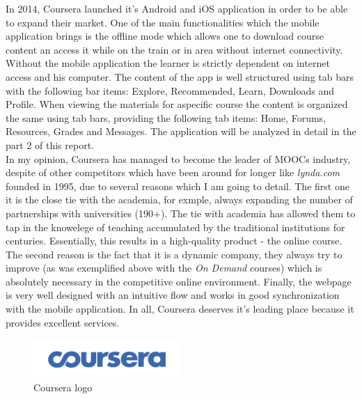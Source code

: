 \documentclass[11]{article}
\begin{document}
	\indent
	In 2014, Coursera launched it's Android and iOS application in order to be able to expand their market. One of the main functionalities which the mobile application brings is the offline mode which allows one to download course content an access it while on the train or in area without internet connectivity. Without the mobile application the learner is strictly dependent on internet access and his computer.  The content of the app is well structured using tab bars with the following bar items: Explore, Recommended, Learn, Downloads and Profile. When viewing the materials for aspecific course the content is organized the same using tab bars, providing the following tab items: Home, Forums, Resources, Grades and Messages. The application will be analyzed in detail in the part 2 of this report.\\
	\indent
	In my opinion, Coursera has managed to become the leader of MOOCs industry, despite of other competitors which have been around for longer like \textit{lynda.com} founded in 1995, due to several reasons which I am going to detail. The first one it is the close tie with the academia, for exmple, always expanding the number of partnerships with universities (190+). The tie with academia has allowed them to tap in the knowelege of teaching accumulated by the traditional institutions for centuries. Essentially, this results in a high-quality product - the online course. The second reason is the fact that it is a dynamic company, they always try to improve (as was exemplified above with the \textit{On Demand} courses) which is absolutely necessary in the competitive online environment. Finally, the webpage is very well designed with an intuitive flow and works in good synchronization with the mobile application. In all, Coursera deserves it's leading place because it provides excellent services. 

\begin{figure}[H]

	\begin{center}
		\includegraphics[width = 0.5\textwidth]{courseraLogo.png}
	\end{center}
	
	\caption{Coursera logo}
	\label{courseraLogo}

\end{figure}
\end{document}
